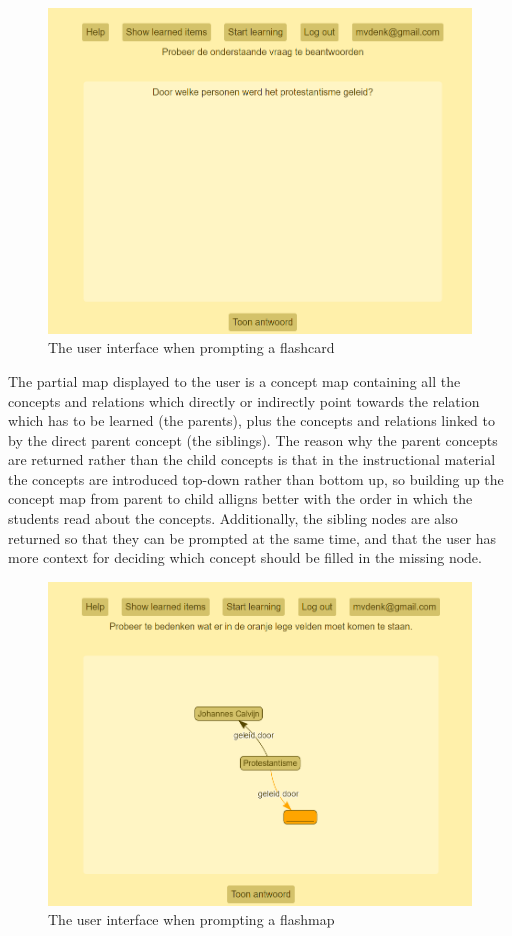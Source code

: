 \begin{figure}
    \centering
    \includegraphics[width=.8\textwidth]{img/ui_fc_prompt.png}
    \caption{The user interface when prompting a flashcard}
    \label{fig:ui_fc_prompt}
\end{figure}

The partial map displayed to the user is a concept map containing all the concepts and relations which directly or indirectly point towards the relation which has to be learned (the parents), plus the concepts and relations linked to by the direct parent concept (the siblings). The reason why the parent concepts are returned rather than the child concepts is that in the instructional material the concepts are introduced top-down rather than bottom up, so building up the concept map from parent to child alligns better with the order in which the students read about the concepts. Additionally, the sibling nodes are also returned so that they can be prompted at the same time, and that the user has more context for deciding which concept should be filled in the missing node.

\begin{figure}
    \centering
    \includegraphics[width=.8\textwidth]{img/ui_fm_prompt.png}
    \caption{The user interface when prompting a flashmap}
    \label{fig:ui_fm_prompt}
\end{figure}

